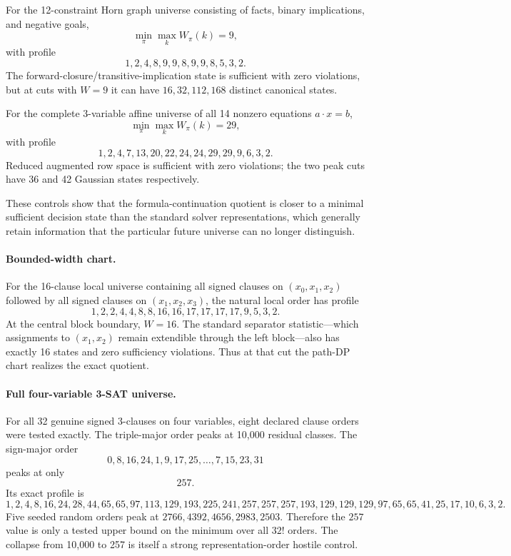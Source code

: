 For the 12-constraint Horn graph universe consisting of facts, binary implications, and
negative goals,
\[
\boxed{\min_\pi\max_k W_\pi(k)=9},
\]
with profile
\[
1,2,4,8,9,9,8,9,9,8,5,3,2.
\]
The forward-closure/transitive-implication state is sufficient with zero violations, but at
cuts with $W=9$ it can have $16,32,112,168$ distinct canonical states.

For the complete 3-variable affine universe of all 14 nonzero equations
$a\cdot x=b$,
\[
\boxed{\min_\pi\max_k W_\pi(k)=29},
\]
with profile
\[
1,2,4,7,13,20,22,24,24,29,29,9,6,3,2.
\]
Reduced augmented row space is sufficient with zero violations; the two peak cuts have 36
and 42 Gaussian states respectively.

These controls show that the formula-continuation quotient is closer to a minimal sufficient
decision state than the standard solver representations, which generally retain information
that the particular future universe can no longer distinguish.

\paragraph{Bounded-width chart.}
For the 16-clause local universe containing all signed clauses on $(x_0,x_1,x_2)$ followed
by all signed clauses on $(x_1,x_2,x_3)$, the natural local order has profile
\[
1,2,2,4,4,8,8,16,16,17,17,17,17,9,5,3,2.
\]
At the central block boundary, $W=16$.  The standard separator statistic---which assignments
to $(x_1,x_2)$ remain extendible through the left block---also has exactly 16 states and zero
sufficiency violations.  Thus at that cut the path-DP chart realizes the exact quotient.

\paragraph{Full four-variable 3-SAT universe.}
For all 32 genuine signed 3-clauses on four variables, eight declared clause orders were
tested exactly.  The triple-major order peaks at 10,000 residual classes.  The sign-major
order
\[
0,8,16,24,1,9,17,25,\ldots,7,15,23,31
\]
peaks at only
\[
\boxed{257}.
\]
Its exact profile is
\[
1,2,4,8,16,24,28,44,65,65,97,113,129,193,225,241,
257,257,257,193,129,129,129,97,65,65,41,25,17,10,6,3,2.
\]
Five seeded random orders peak at $2766,4392,4656,2983,2503$.  Therefore the $257$ value
is only a tested upper bound on the minimum over all $32!$ orders.  The collapse from
10,000 to 257 is itself a strong representation-order hostile control.

